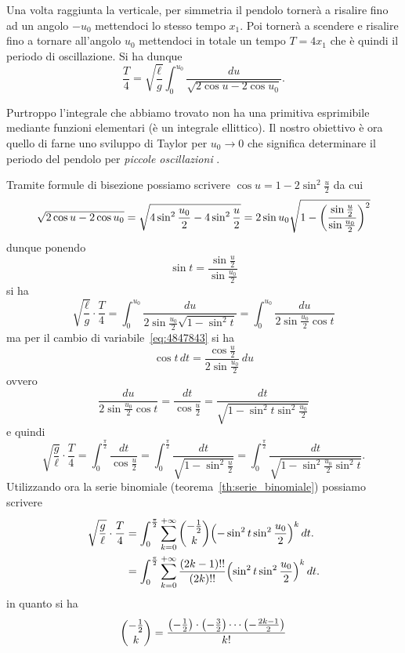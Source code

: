 \begin{example}
Una volta raggiunta la verticale, per simmetria il pendolo tornerà a risalire
fino ad un angolo $-u_0$ mettendoci lo stesso tempo $x_1$. Poi tornerà a scendere
e risalire fino a tornare all'angolo $u_0$ mettendoci in totale un tempo
$T=4x_1$ che è quindi il periodo di oscillazione. Si ha dunque
\[
  \frac{T}{4} = \sqrt{\frac \ell g}\int_0^{u_0} \frac{du}{\sqrt{2\cos u - 2\cos u_0}}.
\]

Purtroppo l'integrale che abbiamo trovato non ha una primitiva
esprimibile mediante funzioni elementari (è un integrale ellittico).
Il nostro obiettivo è ora quello di farne uno sviluppo di Taylor
per $u_0\to 0$ che significa determinare
il periodo del pendolo per \emph{piccole oscillazioni}%
.

Tramite formule di bisezione possiamo scrivere $\cos u = 1 - 2 \sin^2\frac u 2$
da cui
\[
 \sqrt{2\cos u - 2\cos u_0}
 = \sqrt{4\sin^2 \frac {u_0} 2 - 4 \sin^2 \frac{u}{2}}
 = 2\sin u_0 \sqrt{1-{\left( \frac{\sin \frac u 2}{\sin \frac {u_0}2} \right)}^2}
\]
dunque ponendo
\begin{equation}\label{eq:4847843}
 \sin t = \frac{\sin \frac u 2}{\sin \frac{u_0} 2}
\end{equation}
si ha
\[
  \sqrt{\frac \ell g} \cdot \frac T 4
  =  \int_0^{u_0} \frac{du}{2\sin \frac {u_0}2 \sqrt{1-\sin^2 t}}
  = \int_0^{u_0} \frac{du}{2\sin \frac{u_0}2 \cos t}
\]
ma per il cambio di variabile~\eqref{eq:4847843} si ha
\[
  \cos t \, dt = \frac{\cos \frac u 2 }{2 \sin \frac{u_0} 2}\, du
\]
ovvero
\[
 \frac{du}{2\sin \frac {u_0} 2 \cos t} = \frac{dt}{\cos \frac u 2}
 = \frac{dt}{\sqrt{1-\sin^2 t \sin^2\frac{u_0}{2}}}
\]
e quindi
\[
\sqrt{\frac g \ell} \cdot \frac{T}{4}
= \int_0^{\frac \pi 2} \frac{dt}{\cos \frac u 2}
= \int_0^{\frac \pi 2} \frac{dt}{\sqrt{1-\sin^2 \frac u 2}}
= \int_0^{\frac \pi 2} \frac{dt}{\sqrt{1-\sin^2 \frac{u_0}{2} \sin^2 t}}.
\]
Utilizzando ora la serie binomiale (teorema~\ref{th:serie_binomiale})
possiamo scrivere
\begin{align*}
\sqrt{\frac g \ell} \cdot\frac{T}{4}
&= \int_0^{\frac \pi 2} \sum_{k=0}^{+\infty}{-\frac 1 2 \choose k} {\left( -\sin^2 t\sin^2 \frac{u_0}2 \right)}^{k}\, dt.\\
&= \int_0^{\frac \pi 2} \sum_{k=0}^{+\infty}\frac{(2k-1)!!}{(2k)!!} {\left( \sin^2 t\sin^2 \frac{u_0}2 \right)}^{k}\, dt.
\end{align*}
in quanto si ha
\begin{align*}
  {-\frac 1 2 \choose k}
  &= \frac{\enclose{-\frac 1 2}\cdot \enclose{-\frac 3 2} \cdots \enclose{-\frac{2k-1} 2}}{k!}\\

\end{align*}
\end{example}
